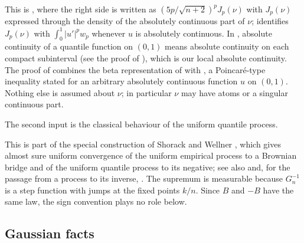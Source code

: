 \documentclass[11pt]{amsart}
\newtheorem{proposition}[theorem]{Proposition}
\newtheorem{lemma}[theorem]{Lemma}
\theoremstyle{remark}
\begin{document}
This is \cite[Theorem~5.3]{BobkovLedoux2019}, where the right side is written as $(5p/\sqrt{n+2})^pJ_p(\nu)$ with $J_p(\nu)$ expressed through the density of the absolutely continuous part of $\nu$; \cite[Corollary~A.22]{BobkovLedoux2019} identifies $J_p(\nu)$ with $\int_0^1|u'|^pw_p$ whenever $u$ is absolutely continuous. In \cite{BobkovLedoux2019}, absolute continuity of a quantile function on $(0,1)$ means absolute continuity on each compact subinterval (see the proof of \cite[Proposition~A.17]{BobkovLedoux2019}), which is our local absolute continuity. The proof of \cite[Theorem~5.3]{BobkovLedoux2019} combines the beta representation of \cite[Theorem~4.6]{BobkovLedoux2019} with \cite[Proposition~B.13]{BobkovLedoux2019}, a Poincar\'e-type inequality stated for an arbitrary absolutely continuous function $u$ on $(0,1)$. Nothing else is assumed about $\nu$; in particular $\nu$ may have atoms or a singular continuous part.

The second input is the classical behaviour of the uniform quantile process.


This is part of the special construction of Shorack and Wellner \cite[Theorem~3.1.1]{ShorackWellner1986}, which gives almost sure uniform convergence of the uniform empirical process to a Brownian bridge and of the uniform quantile process to its negative; see also \cite{Csorgo1983} and, for the passage from a process to its inverse, \cite{Vervaat1972}. The supremum is measurable because $G_n^{-1}$ is a step function with jumps at the fixed points $k/n$. Since $B$ and $-B$ have the same law, the sign convention plays no role below.

\subsection{Gaussian facts}

\end{document}
